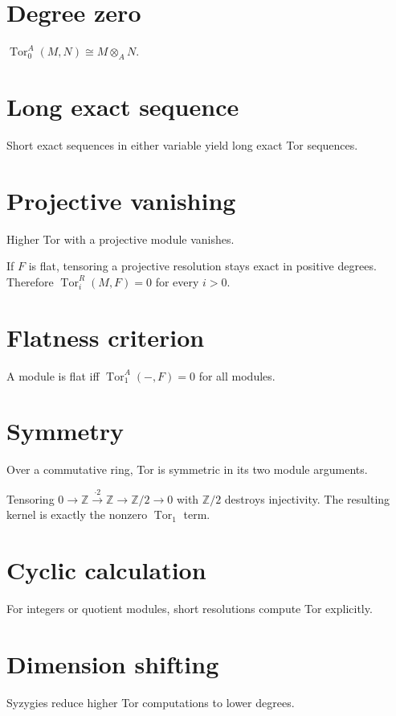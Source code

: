 \section{Degree zero}
$\operatorname{Tor}_0^A(M,N)\cong M\otimes_A N$.

\section{Long exact sequence}
Short exact sequences in either variable yield long exact Tor sequences.

\section{Projective vanishing}
Higher Tor with a projective module vanishes.

\begin{example}\label{ex:v26-expand-02}
If $F$ is flat, tensoring a projective resolution stays exact in positive degrees. Therefore $\operatorname{Tor}_i^R(M,F)=0$ for every $i>0$.
\end{example}
\section{Flatness criterion}
A module is flat iff $\operatorname{Tor}_1^A(-,F)=0$ for all modules.

\section{Symmetry}
Over a commutative ring, Tor is symmetric in its two module arguments.

\begin{example}\label{ex:v26-expand-03}
Tensoring $0\to\mathbb Z\xrightarrow{\cdot2}\mathbb Z\to\mathbb Z/2\to0$ with $\mathbb Z/2$ destroys injectivity. The resulting kernel is exactly the nonzero $\operatorname{Tor}_1$ term.
\end{example}
\section{Cyclic calculation}
For integers or quotient modules, short resolutions compute Tor explicitly.

\section{Dimension shifting}
Syzygies reduce higher Tor computations to lower degrees.

